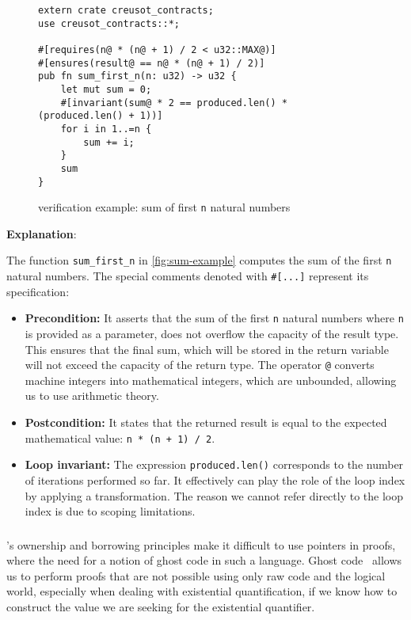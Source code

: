 \documentclass[11pt,a4paper]{article}
\begin{document}
\begin{figure}[tp]
\centering
\begin{minipage}{0.95\linewidth}
\begin{verbatim}
extern crate creusot_contracts;
use creusot_contracts::*;

#[requires(n@ * (n@ + 1) / 2 < u32::MAX@)]
#[ensures(result@ == n@ * (n@ + 1) / 2)]
pub fn sum_first_n(n: u32) -> u32 {
    let mut sum = 0;
    #[invariant(sum@ * 2 == produced.len() * (produced.len() + 1))]
    for i in 1..=n {
        sum += i;
    }
    sum
}
\end{verbatim}
\caption{\creusot{} verification example: sum of first \texttt{n} natural numbers}
\label{fig:sum-example}
\end{minipage}
\end{figure}

\textbf{Explanation}: 

The function \texttt{sum\_first\_n} in \autoref{fig:sum-example} computes the sum of the first \texttt{n} natural numbers. The special comments denoted with \texttt{\#[...]} represent its specification:
\begin{itemize}
\item \textbf{Precondition:} It asserts that the sum of the first \texttt{n} natural numbers where \texttt{n} is provided as a parameter, does not overflow the capacity of the result type. This ensures that the final sum, which will be stored in the return variable will not exceed the capacity of the return type. The operator \texttt{@} converts machine integers into mathematical integers, which are unbounded, allowing us to use arithmetic theory.
\item \textbf{Postcondition:} It states that the returned result is equal to the expected mathematical value: \texttt{n * (n + 1) / 2}.
\item \textbf{Loop invariant:} The expression \texttt{produced.len()} corresponds to the number of iterations performed so far. It effectively can play the role of the loop index by applying a transformation. The reason we cannot refer directly to the loop index is due to scoping limitations.
\end{itemize}
\subsubsection{}
\rust{}'s ownership and borrowing principles make it difficult to use pointers in proofs, where the need for a notion of ghost code in such a language. Ghost code~\cite{jcfand} allows us to perform proofs that are not possible using only raw code and the logical world, especially when dealing with existential quantification, if we know how to construct the value we are seeking for the existential quantifier.
\end{document}
